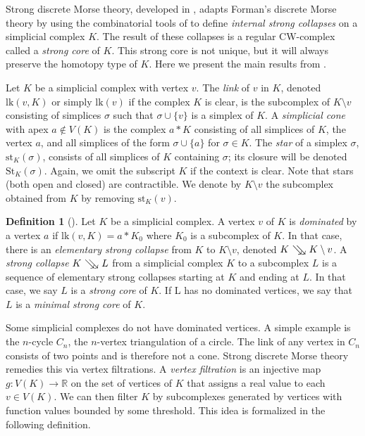 \documentclass{amsart}
\theoremstyle{definition}
\newtheorem{definition}[theorem]{Definition}
\newcommand\sco{{\searrow \hspace{-6 pt}\searrow\hspace{3 pt}}}
\begin{document}
Strong discrete Morse theory, developed in \cite{Fernandez2026}, adapts Forman's discrete Morse theory by using the combinatorial tools of \cite{BarmakMinian2009} to define \textit{internal strong collapses} on a simplicial complex $K$. The result of these collapses is a regular CW-complex called a \textit{strong core} of $K$. This strong core is not unique, but it will always preserve the homotopy type of $K$. Here we present the main results from \cite{Fernandez2026}.

Let $K$ be a simplicial complex with vertex $v$. The \textit{link} of $v$ in $K$, denoted $\text{lk}(v,K)$ or simply $\text{lk}(v)$ if the complex $K$ is clear, is the subcomplex of $K\setminus v$ consisting of simplices $\sigma$ such that $\sigma\cup\{v\}$ is a simplex of $K$. A \textit{simplicial cone} with apex $a\not\in V(K)$ is the complex $a*K$ consisting of all simplices of $K$, the vertex $a$, and all simplices of the form $\sigma\cup\{a\}$ for $\sigma\in K$. The \textit{star} of a simplex $\sigma$,  $\text{st}_K(\sigma)$, consists of all simplices of $K$ containing $\sigma$; its closure will be denoted $\text{St}_K(\sigma)$. Again, we omit the subscript $K$ if the context is clear. Note that stars (both open and closed) are contractible. We denote by $K\setminus v$ the subcomplex obtained from $K$ by removing $\text{st}_K(v)$.

\begin{definition}[\cite{BarmakMinian2009}]
Let $K$ be a simplicial complex. A vertex $v$ of $K$ is \textit{dominated} by a vertex $a$ if $\text{lk}(v,K)=a*K_0$ where $K_0$ is a subcomplex of $K$. In that case, there is an \textit{elementary strong collapse} from $K$ to $K\setminus v$, denoted $K~\sco K\setminus v$. A \textit{strong collapse} $K~\sco L$ from a simplicial complex $K$ to a subcomplex $L$ is a sequence of elementary strong collapses starting at $K$ and ending at $L$. In that case, we say $L$ is a \textit{strong core} of $K$. If L has no dominated vertices, we say that $L$ is a \textit{minimal strong core} of $K$. 
\end{definition}

Some simplicial complexes do not have dominated vertices. A simple example is the $n$-cycle $C_n$, the $n$-vertex triangulation of a circle. The link of any vertex in $C_n$ consists of two points and is therefore not a cone. Strong discrete Morse theory remedies this via vertex filtrations. A \textit{vertex filtration} is an injective map $g:V(K)\to\mathbb{R}$ on the set of vertices of $K$ that assigns a real value to each $v\in V(K)$. We can then filter $K$ by subcomplexes generated by vertices with function values bounded by some threshold. This idea is formalized in the following definition.
\end{document}
